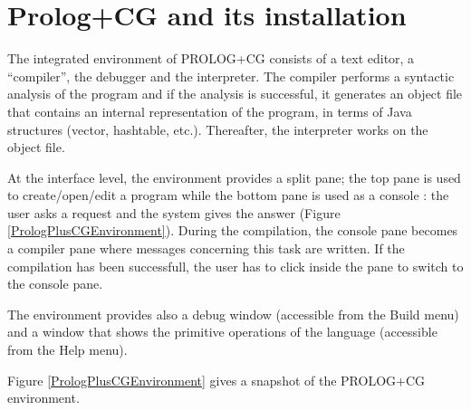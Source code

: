 \documentclass{book}
\begin{document}
\section{Prolog+CG and its installation}\label{Sec:EnvAndInstall}

The integrated environment of PROLOG+CG consists of a text editor, a
``compiler'', the debugger and the interpreter. The compiler performs
a syntactic analysis of the program and if the analysis is successful,
it generates an object file that contains an internal representation
of the program, in terms of Java structures (vector, hashtable,
etc.). Thereafter, the interpreter works on the object file.

At the interface level, the environment provides a split pane; the top
pane is used to create/open/edit a program while the bottom pane is
used as a console : the user asks a request and the system gives the
answer (Figure \ref{PrologPlusCGEnvironment}). During the compilation,
the console pane becomes a compiler pane where messages concerning
this task are written. If the compilation has been successfull, the
user has to click inside the pane to switch to the console pane.

The environment provides also a debug window (accessible from the
Build menu) and a window that shows the primitive operations of the
language (accessible from the Help menu).

Figure \ref{PrologPlusCGEnvironment} gives a snapshot of the PROLOG+CG
environment.
\end{document}
